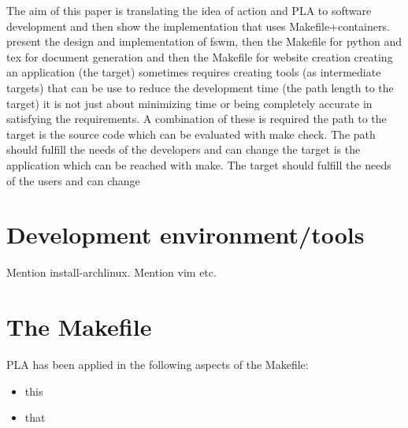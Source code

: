 \documentclass[journal]{IEEEtran}
\begin{document}
The aim of this paper is translating the idea of action and PLA to software development and then show the implementation that uses Makefile+containers.
present the design and implementation of fswm, then the Makefile for python and tex for document generation and then the Makefile for website creation
creating an application (the target) sometimes requires creating tools (as intermediate targets) that can be use to reduce the development time (the path length to the target)
it is not just about minimizing time or being completely accurate in satisfying the requirements. A combination of these is required
the path to the target is the source code which can be evaluated with make check. The path should fulfill the needs of the developers and can change
the target is the application which can be reached with make. The target should fulfill the needs of the users and can change

\section{Development environment/tools}
Mention install-archlinux.
Mention vim etc.

\section{The Makefile}
PLA has been applied in the following aspects of the Makefile:
\begin{itemize}
	\item this
	\item that
\end{itemize}
\end{document}
